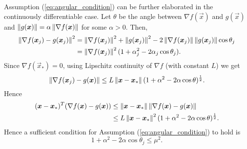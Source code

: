 Assumption (\ref{eq:angular_condition}) can be further elaborated in the continuously differentiable case.
Let $\theta$ be the angle between $\nabla f(\vec{x})$ and $g(\vec{x})$ and $\left\Vert g(\boldsymbol{x}) \right\Vert = \alpha \left\Vert \nabla f(\boldsymbol{x}) \right\Vert$ for some $\alpha>0$.
Then,
\begin{align}
\left\Vert \nabla f(\boldsymbol{x}_j)-g(\boldsymbol{x}_j) \right\Vert^2 &= \left\Vert \nabla f(\boldsymbol{x}_j) \right\Vert^2 + \left\Vert g(\boldsymbol{x}_j) \right\Vert^2 -2\left\Vert \nabla f(\boldsymbol{x}_j) \right\Vert\left\Vert g(\boldsymbol{x}_j) \right\Vert\cos\theta_j\\
&=  \left\Vert \nabla f(\boldsymbol{x}_j) \right\Vert^2(1+\alpha_j^2-2\alpha_j \cos\theta_j).
\end{align}
Since $\nabla f(\vec{x}_*)=0$, using Lipschitz continuity of $\nabla f$ (with constant $L$) we get
\begin{equation}
\left\Vert \nabla f(\boldsymbol{x}_j)-g(\boldsymbol{x}) \right\Vert \leq L\left\Vert \boldsymbol{x}-\boldsymbol{x}_* \right\Vert (1+\alpha^2-2\alpha \cos\theta)^{\frac{1}{2}}.
\end{equation}
Hence
\begin{align}
(\boldsymbol{x}-\boldsymbol{x}_*)^T (\nabla f(\boldsymbol{x}) -g(\boldsymbol{x})) &\leq \left\Vert \boldsymbol{x}-\boldsymbol{x}_* \right\Vert \left\Vert \nabla f(\boldsymbol{x}) -g(\boldsymbol{x}) \right\Vert\\
&\leq L\left\Vert \boldsymbol{x}-\boldsymbol{x}_* \right\Vert^2 (1+\alpha^2-2\alpha \cos\theta)^{\frac{1}{2}}.
\end{align}
Hence a sufficient condition for Assumption (\ref{eq:angular_condition}) to hold is
\begin{equation}
1+\alpha^2-2\alpha \cos\theta_j\leq \mu^2.
\end{equation} 
